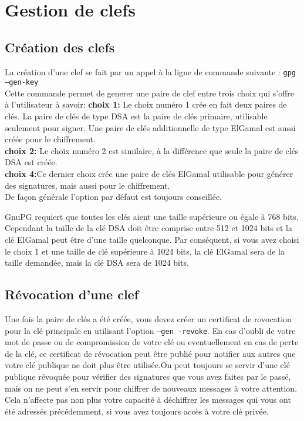 
\section{Gestion de clefs}
\subsection{Création des clefs}
 La création d'une clef se fait par un appel à la ligne de commande suivante : \texttt{gpg --gen-key}\\
Cette commande permet de generer une paire de clef entre trois choix qui s'offre à l'utilisateur à savoir:
\textbf{choix 1:} Le choix numéro 1 crée en fait deux paires de clés. La paire de clés de type DSA est la paire de clés primaire, utilisable seulement pour signer. Une paire de clés additionnelle de type ElGamal est aussi créée pour le chiffrement.\\
\textbf{choix 2:} Le choix numéro 2 est similaire, à la différence que seule la paire de clés DSA est créée.\\
\textbf{choix 4:}Ce dernier choix crée une paire de clés ElGamal utilisable pour générer des signatures, mais aussi pour le chiffrement.\\
De façon générale l'option par défaut est toujours conseillée.

GnuPG requiert que toutes les clés aient une taille supérieure ou égale à 768 bits. Cependant la taille de la clé DSA doit être comprise entre 512 et 1024 bits et la clé ElGamal peut être d'une taille quelconque. Par conséquent, si vous avez choisi le choix 1 et une taille de clé supérieure à 1024 bits, la clé ElGamal sera de la taille demandée, mais la clé DSA sera de 1024 bits.
\subsection{Révocation d'une clef}
 Une fois la paire de clés a été créée, vous devez créer un certificat de rovocation pour la clé principale en utilisant l'option \texttt{--gen -revoke}. En cas d'oubli de votre mot de passe ou de compromission de votre clé ou eventuellement en cas de perte de la clé, ce certificat de révocation peut être publié pour notifier aux autres que votre clé publique ne doit plus être utilisée.On peut toujours se servir d'une clé publique révoquée pour vérifier des signatures que vous avez faites par le passé, mais on ne peut s'en servir pour chiffrer de nouveaux messages à votre attention. Cela n'affecte pas non plus votre capacité à déchiffrer les messages qui vous ont été adressés précédemment, si vous avez toujours accès à votre clé privée. 
